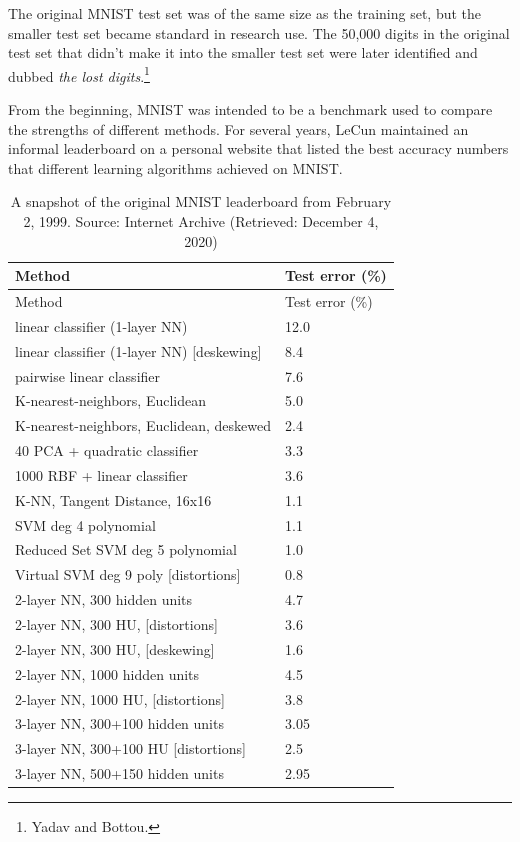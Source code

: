 \documentclass{tufte-book}
\begin{document}
The original MNIST test set was of the same size as the training set,
but the smaller test set became standard in research use. The 50,000
digits in the original test set that didn't make it into the smaller
test set were later identified and dubbed \emph{the lost
digits}.\footnote{Yadav and Bottou.}

From the beginning, MNIST was intended to be a benchmark used to compare
the strengths of different methods. For several years, LeCun maintained
an informal leaderboard on a personal website that listed the best
accuracy numbers that different learning algorithms achieved on
MNIST.

\begin{longtable}[]{@{}ll@{}}
\caption{A snapshot of the original MNIST leaderboard from February 2,
1999. Source: Internet Archive (Retrieved: December 4,
2020)}\tabularnewline
\toprule
Method & Test error (\%) \\
\midrule
\endfirsthead
\toprule
Method & Test error (\%) \\
\midrule
\endhead
linear classifier (1-layer NN) & 12.0 \\
linear classifier (1-layer NN) {[}deskewing{]} & 8.4 \\
pairwise linear classifier & 7.6 \\
K-nearest-neighbors, Euclidean & 5.0 \\
K-nearest-neighbors, Euclidean, deskewed & 2.4 \\
40 PCA + quadratic classifier & 3.3 \\
1000 RBF + linear classifier & 3.6 \\
K-NN, Tangent Distance, 16x16 & 1.1 \\
SVM deg 4 polynomial & 1.1 \\
Reduced Set SVM deg 5 polynomial & 1.0 \\
Virtual SVM deg 9 poly {[}distortions{]} & 0.8 \\
2-layer NN, 300 hidden units & 4.7 \\
2-layer NN, 300 HU, {[}distortions{]} & 3.6 \\
2-layer NN, 300 HU, {[}deskewing{]} & 1.6 \\
2-layer NN, 1000 hidden units & 4.5 \\
2-layer NN, 1000 HU, {[}distortions{]} & 3.8 \\
3-layer NN, 300+100 hidden units & 3.05 \\
3-layer NN, 300+100 HU {[}distortions{]} & 2.5 \\
3-layer NN, 500+150 hidden units & 2.95 \\

\end{longtable}
\end{document}
